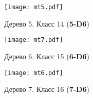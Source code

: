 \begin{figure}[H]
    \centering
    \texttt{[image: mt5.pdf]}
    \hfill
    \caption{Дерево 5. Класс 14 ({\bf 5-D6})}
    \label{fig:tree5}
\end{figure}

\begin{figure}[H]
    \centering
    \texttt{[image: mt7.pdf]}
    \hfill
    \caption{Дерево 6. Класс 15 ({\bf 6-D6})}
    \label{fig:tree6}
\end{figure}

\begin{figure}[H]
    \centering
    \texttt{[image: mt6.pdf]}
    \hfill
    \caption{Дерево 7. Класс 16 ({\bf 7-D6})}
    \label{fig:tree7}
\end{figure}
